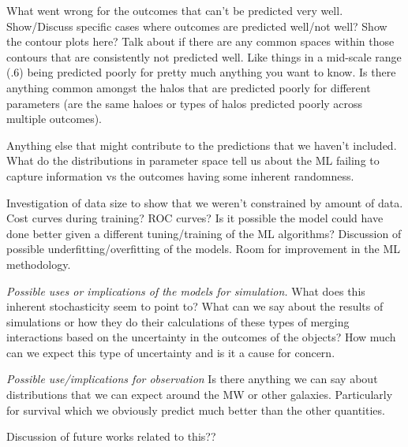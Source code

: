 \documentclass[fleqn,usenatbib]{mnras}
\begin{document}
What went wrong for the outcomes that can't be predicted very well. Show/Discuss specific cases where outcomes are predicted well/not well? Show the contour plots here? Talk about if there are any common spaces within those contours that are consistently not predicted well. Like things in a mid-scale range (.6) being predicted poorly for pretty much anything you want to know. Is there anything common amongst the halos that are predicted poorly for different parameters (are the same haloes or types of halos predicted poorly across multiple outcomes).

 Anything else that might contribute to the predictions that we haven't included. What do the distributions in parameter space tell us about the ML failing to capture information vs the outcomes having some inherent randomness.

 Investigation of data size to show that we weren't constrained by amount of data. Cost curves during training? ROC curves? Is it possible the model could have done better given a different tuning/training of the ML algorithms? Discussion of possible underfitting/overfitting of the models. Room for improvement in the ML methodology.

\textit{Possible uses or implications of the models for simulation.} What does this inherent stochasticity seem to point to? What can we say about the results of simulations or how they do their calculations of these types of merging interactions based on the uncertainty in the outcomes of the objects? How much can we expect this type of uncertainty and is it a cause for concern.

\textit{Possible use/implications for observation} Is there anything we can say about distributions that we can expect around the MW or other galaxies. Particularly for survival which we obviously predict much better than the other quantities.

Discussion of future works related to this??
\end{document}
